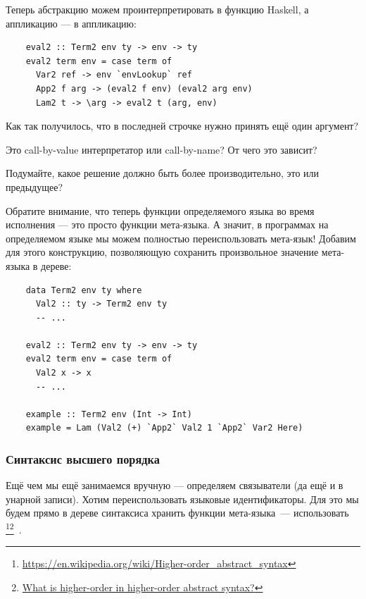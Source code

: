 Теперь абстракцию можем проинтерпретировать в функцию Haskell, а аппликацию --- в аппликацию:
\begin{verbatim}
    eval2 :: Term2 env ty -> env -> ty
    eval2 term env = case term of
      Var2 ref -> env `envLookup` ref
      App2 f arg -> (eval2 f env) (eval2 arg env)
      Lam2 t -> \arg -> eval2 t (arg, env)
\end{verbatim}

\begin{task}
    Как так получилось, что в последней строчке нужно принять ещё один аргумент?
\end{task}

\begin{task}
    Это call-by-value интерпретатор или call-by-name?
    От чего это зависит?
\end{task}

\begin{task}
    Подумайте, какое решение должно быть более производительно, это или предыдущее?
\end{task}

Обратите внимание, что теперь функции определяемого языка во время исполнения --- это просто функции мета-языка.
А значит, в программах на определяемом языке мы можем полностью переиспользовать мета-язык!
Добавим для этого конструкцию, позволяющую сохранить произвольное значение мета-языка в дереве:
\begin{verbatim}
    data Term2 env ty where
      Val2 :: ty -> Term2 env ty
      -- ...

    eval2 :: Term2 env ty -> env -> ty
    eval2 term env = case term of
      Val2 x -> x
      -- ...

    example :: Term2 env (Int -> Int)
    example = Lam (Val2 (+) `App2` Val2 1 `App2` Var2 Here)
\end{verbatim}

\subsubsection{Синтаксис высшего порядка} \label{subsubsec:h-syntax}

Ещё чем мы ещё занимаемся вручную --- определяем связыватели (да ещё и в унарной записи).
Хотим переиспользовать языковые идентификаторы.
Для это мы будем прямо в дереве синтаксиса хранить функции мета-языка~--- использовать \footnote{\url{https://en.wikipedia.org/wiki/Higher-order_abstract_syntax}}\footnote{\href{https://cstheory.stackexchange.com/questions/20071/what-is-higher-order-in-higher-order-abstract-syntax}{What is higher-order in higher-order abstract syntax?}}~\cite{pfenning1988higher}.

